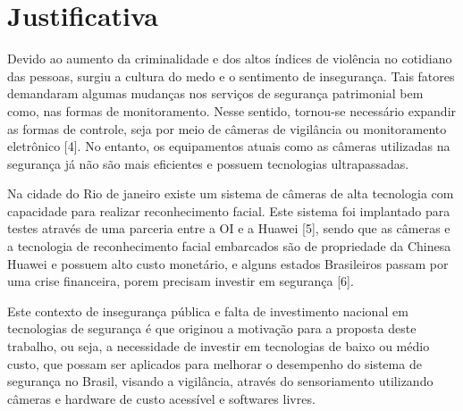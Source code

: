 \section{Justificativa} 
Devido ao aumento da criminalidade e dos altos índices de violência no cotidiano das pessoas, surgiu a cultura do medo e o sentimento de insegurança. Tais fatores demandaram algumas mudanças nos serviços de segurança patrimonial bem como, nas formas de monitoramento. Nesse sentido, tornou-se necessário expandir as formas de controle, seja por meio de câmeras de vigilância ou monitoramento eletrônico \cite{quatro}[4]. No entanto, os equipamentos atuais como as câmeras utilizadas na segurança já não são mais eficientes e possuem tecnologias ultrapassadas. 

Na cidade do Rio de janeiro existe um sistema de câmeras de alta tecnologia com capacidade para realizar reconhecimento facial. Este sistema foi implantado para testes através de uma parceria entre a OI e a Huawei \cite{cinco}[5], sendo que as câmeras e a tecnologia de reconhecimento facial embarcados são de propriedade da Chinesa Huawei e possuem alto custo monetário, e alguns estados Brasileiros passam por uma crise financeira, porem precisam investir em segurança \cite{seis}[6].

Este contexto de insegurança pública e falta de investimento nacional em tecnologias de segurança é que originou a motivação para a proposta deste trabalho, ou seja, a necessidade de investir em tecnologias de baixo ou médio custo, que possam ser aplicados para melhorar o desempenho do sistema de segurança no Brasil, visando a vigilância, através do sensoriamento utilizando câmeras e hardware de custo acessível e softwares livres.



